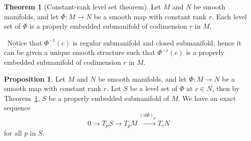 \documentclass[12pt,a4paper]{book}
\newenvironment{prooff}{{\noindent\it\textcolor{cyan!40!black}{Proof}:}\,}{\par}
\newcommand{\rarr}[1]{\xrightarrow{#1}}
\theoremstyle{definition}
\newtheorem{theo}[defn]{Theorem}
\newtheorem{prop}[defn]{Proposition}
\begin{document}
\begin{theo}[Constant-rank level set theorem]
    Let $M$ and $N$ be smooth manifolds, and
    let $\Phi: M \rightarrow N$ be a smooth map with constant rank $r$.
    Each level set of $\Phi$ is a properly embedded submanifold of codimension $r$ in $M$.
    \label{theorem:Constant-rank level set theorem}
\end{theo}
\begin{prooff}
    Notice that $\Phi^{-1}(c)$ is regular submanifold and closed submanifold, hence it can be given a unique smooth structure such that
    $\Phi^{-1}(c)$ is a properly embedded submanifold of codimension $r$ in $M$.
\end{prooff}
\begin{prop}
    Let $M$ and $N$ be smooth manifolds, and
    let $\Phi: M \rightarrow N$ be a smooth map with constant rank $r$.
    Let $S$ be a level set of $\Phi$ at $c\in N$, then by Theorem~\ref{theorem:Constant-rank level set theorem}, $S$ be a properly embedded submanifold of $M$.
    We have an exact sequence
    \begin{equation*}
        0\rightarrow T_pS\rightarrow T_pM\rarr{(\text{d}\Phi)_p} T_cN
    \end{equation*}
    for all $p$ in $S$.
\end{prop}
\end{document}
